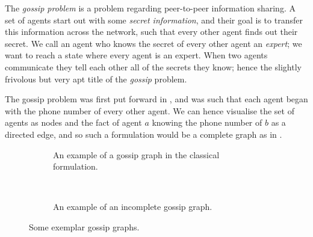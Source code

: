 \documentclass[10pt, a4paper]{report}
\begin{document}
The \emph{gossip problem} is a problem regarding peer-to-peer information sharing. A
set of agents start out with some \emph{secret information}, and their goal is
to transfer this information across the network, such that every other agent
finds out their secret. We call an agent who knows the secret of every other
agent an \emph{expert}; we want to reach a state where every agent is an
expert. When two agents communicate they tell each other all of the secrets they
know; hence the slightly frivolous but very apt title of the \emph{gossip}
problem.

The gossip problem was first put forward in \cite{Tijdeman:1971}, and was such
that each agent began with the phone number of every other agent. We can hence
visualise the set of agents as nodes and the fact of agent $a$ knowing the phone
number of $b$ as a directed edge, and so such a formulation would be a complete
graph as in .

\begin{figure}[h]
  \centering
  \begin{subfigure}[c]{0.4\textwidth}
    \centering
    \caption{An example of a gossip graph in the classical formulation.}
    \label{fig:classicgossipex}
  \end{subfigure}%
  ~
  \begin{subfigure}[c] {0.4\textwidth}
    \centering
    \caption{An example of an incomplete gossip graph. }
    \label{fig:dynamicgossipex}

  \end{subfigure}
  \caption{Some exemplar gossip graphs.}
\end{figure}
\end{document}
